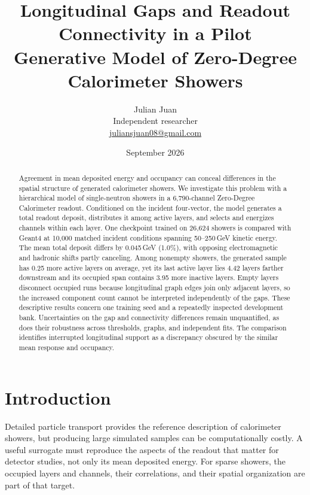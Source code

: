 \documentclass[11pt]{article}
\title{Longitudinal Gaps and Readout Connectivity in a Pilot\\Generative Model of Zero-Degree Calorimeter Showers}
\author{Julian Juan\\[3pt]\small Independent researcher\\\small\href{mailto:juliansjuan08@gmail.com}{juliansjuan08@gmail.com}}
\date{September 2026}
\begin{document}
\maketitle

\begin{abstract}
Agreement in mean deposited energy and occupancy can conceal differences in the spatial structure of generated calorimeter showers. We investigate this problem with a hierarchical model of single-neutron showers in a 6,790-channel Zero-Degree Calorimeter readout. Conditioned on the incident four-vector, the model generates a total readout deposit, distributes it among active layers, and selects and energizes channels within each layer. One checkpoint trained on 26,624 showers is compared with Geant4 at 10,000 matched incident conditions spanning 50--250\,GeV kinetic energy. The mean total deposit differs by 0.045\,GeV (1.0\%), with opposing electromagnetic and hadronic shifts partly canceling. Among nonempty showers, the generated sample has 0.25 more active layers on average, yet its last active layer lies 4.42 layers farther downstream and its occupied span contains 3.95 more inactive layers. Empty layers disconnect occupied runs because longitudinal graph edges join only adjacent layers, so the increased component count cannot be interpreted independently of the gaps. These descriptive results concern one training seed and a repeatedly inspected development bank. Uncertainties on the gap and connectivity differences remain unquantified, as does their robustness across thresholds, graphs, and independent fits. The comparison identifies interrupted longitudinal support as a discrepancy obscured by the similar mean response and occupancy.
\end{abstract}

\section{Introduction}

Detailed particle transport provides the reference description of calorimeter showers, but producing large simulated samples can be computationally costly. A useful surrogate must reproduce the aspects of the readout that matter for detector studies, not only its mean deposited energy. For sparse showers, the occupied layers and channels, their correlations, and their spatial organization are part of that target.
\end{document}
